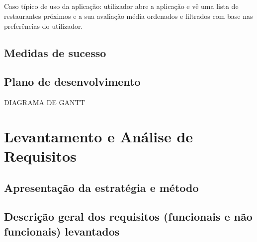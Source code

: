 \documentclass[a4paper,12pt]{scrreprt}
\begin{document}
\paragraph{}
Caso típico de uso da aplicação: utilizador abre a aplicação e vê uma lista de restaurantes próximos e a sua avaliação média ordenados e filtrados com base nas preferências do utilizador.
\section{Medidas de sucesso}
\section{Plano de desenvolvimento}
DIAGRAMA DE GANTT

\chapter{Levantamento e Análise de Requisitos}

\section{Apresentação da estratégia e método}
            
\section{Descrição geral dos requisitos (funcionais e não funcionais) levantados}
\end{document}
